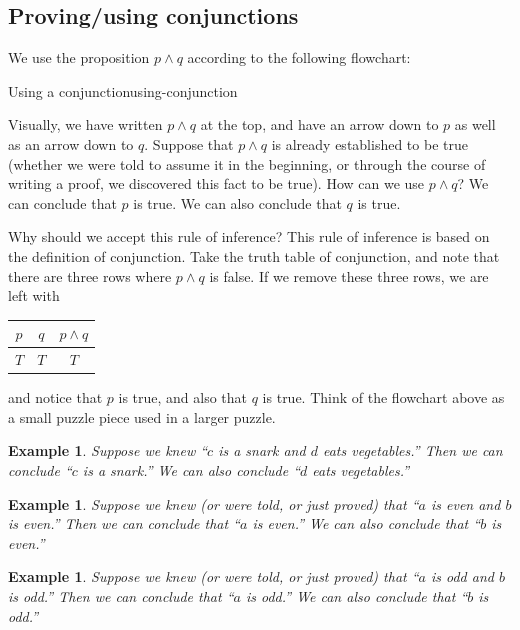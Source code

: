 \documentclass{book}
\newcounter{ekcounter}%
\theoremstyle{ekimcustom}
\newtheorem{example}[ekcounter]{Example}
\begin{document}
\subsection{Proving/using conjunctions}\label{section:proving-using-conjunction}

We use the proposition $p \wedge q$ according to the following flowchart:
\begin{bmethod}{Using a conjunction}{using-conjunction}
\begin{center}
\end{center}
\end{bmethod}
Visually, we have written $p \wedge q$ at the top, and have an arrow down to $p$ as well as an arrow down to $q$. Suppose that $p \wedge q$ is already established to be true (whether we were told to assume it in the beginning, or through the course of writing a proof, we discovered this fact to be true). How can we use $p \wedge q$? We can conclude that $p$ is true. We can also conclude that $q$ is true.

Why should we accept this rule of inference? This rule of inference is based on the definition of conjunction. Take the truth table of conjunction, and note that there are three rows where $p \wedge q$ is false. If we remove these three rows, we are left with
\begin{center}
\begin{tabular}{c|c||c}
$p$ & $q$ & $p \wedge q$ \\\hline
$T$ & $T$ & $T$
\end{tabular}
\end{center}
and notice that $p$ is true, and also that $q$ is true. Think of the flowchart above as a small puzzle piece used in a larger puzzle.
\begin{example}
Suppose we knew ``$c$ is a snark and $d$ eats vegetables.'' Then we can conclude ``$c$ is a snark.'' We can also conclude ``$d$ eats vegetables.''
\end{example}
\begin{example}
Suppose we knew (or were told, or just proved) that ``$a$ is even and $b$ is even.'' Then we can conclude that ``$a$ is even.'' We can also conclude that ``$b$ is even.''
\end{example}
\begin{example}\label{example:a-odd-and-b-odd-use-and}
Suppose we knew (or were told, or just proved) that ``$a$ is odd and $b$ is odd.'' Then we can conclude that ``$a$ is odd.'' We can also conclude that ``$b$ is odd.''
\end{example}
\end{document}
